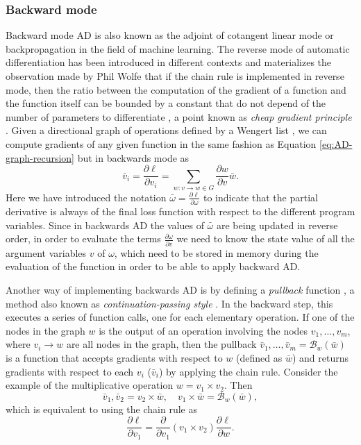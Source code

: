\subsubsection{Backward mode}

Backward mode AD is also known as the adjoint of cotangent linear mode or backpropagation in the field of machine learning. 
The reverse mode of automatic differentiation has been introduced in different contexts \cite{griewank2012invented} and materializes the observation made by Phil Wolfe that if the chain rule is implemented in reverse mode, then the ratio between the computation of the gradient of a function and the function itself can be bounded by a constant that do not depend of the number of parameters to differentiate \cite{Griewack-on-AD, Wolfe_1982}, a point known as \textit{cheap gradient principle} \cite{griewank2012invented}.  
Given a directional graph of operations defined by a Wengert list \cite{Wengert_1964}, we can compute gradients of any given function in the same fashion as Equation \eqref{eq:AD-graph-recursion} but in backwards mode as
\begin{equation}
 \bar v_i = \frac{\partial \ell}{\partial v_i}= \sum_{w : v \rightarrow w \in G} \frac{\partial w}{\partial v} \bar{w}.
\end{equation}
Here we have introduced the notation $\bar{\omega} = \frac{\partial \ell}{\partial \omega}$ to indicate that the partial derivative is always of the final loss function with respect to the different program variables. 
Since in backwards AD the values of $\bar \omega$ are being updated in reverse order, in order to evaluate the terms $\frac{\partial \omega}{\partial v}$ we need to know the state value of all the argument variables $v$ of $\omega$, which need to be stored in memory during the evaluation of the function in order to be able to apply backward AD.

Another way of implementing backwards AD is by defining a \textit{pullback} function \cite{Innes_2018}, a method also known as \textit{continuation-passing style} \cite{Wang_Zheng_Decker_Wu_Essertel_Rompf_2019}.
In the backward step, this executes a series of function calls, one for each elementary operation.
If one of the nodes in the graph $w$ is the output of an operation involving the nodes $v_1, \ldots, v_m$, where $v_i \rightarrow w$ are all nodes in the graph, then the pullback $\bar v_1, \ldots, \bar v_m = \mathcal B_w(\bar w)$ is a function that accepts gradients with respect to $w$ (defined as $\bar w$) and returns gradients with respect to each $v_i$ ($\bar v_i$) by applying the chain rule. 
Consider the example of the multiplicative operation $w = v_1 \times v_2$. Then
\begin{equation}
 \bar v_1, \bar v_2 = v_2 \times \bar w , \quad
 v_1 \times \bar w = \mathcal{B}_w (\bar w),
\end{equation}
which is equivalent to using the chain rule as
\begin{equation}
 \frac{\partial \ell}{\partial v_1} = \frac{\partial}{\partial v_1}(v_1 \times v_2) \frac{\partial \ell}{\partial w}.
\end{equation}


